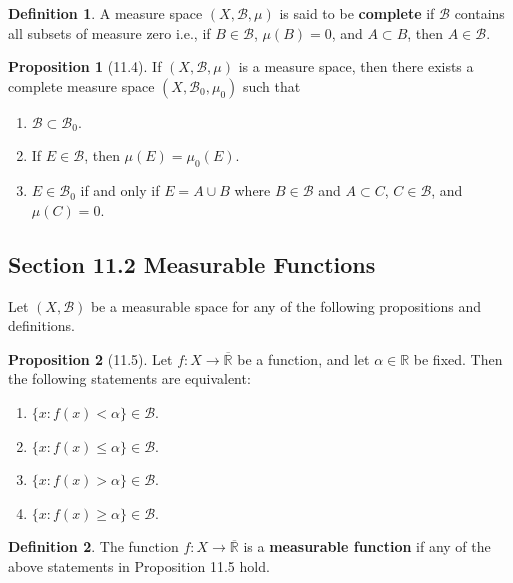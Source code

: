 \documentclass[12pt]{article}
\newcommand{\R}{\mathbb{R}}
\newcommand{\B}{\mathcal{B}}
\theoremstyle{definition}
\newtheorem*{definition}{Definition}
\newtheorem*{prop}{Proposition}
\begin{document}
\begin{definition}
  A measure space \( (X, \B, \mu) \) is said to be \textbf{complete} if \( \B \) contains all subsets of measure zero i.e., if \( B \in \B \), \( \mu(B) = 0 \), and \( A \subset B \), then \( A \in \B \).
\end{definition}

\begin{prop}[11.4]

  If \( (X, \B, \mu) \) is a measure space, then there exists a complete measure space \( (X, \B_0, \mu_0) \) such that 
    \begin{enumerate}[label = (\roman{*})]
      \item \( \B \subset \B_0 \).  
      \item If \( E \in \B \), then \( \mu(E) = \mu_0(E) \). 
      \item \( E \in \B_0 \) if and only if \( E = A \cup B \) where \( B \in \B \) and \( A \subset C \), \( C \in \B \), and \( \mu(C) = 0 \). 
    \end{enumerate}

\end{prop}

\subsection*{Section 11.2 Measurable Functions}

Let \( (X, \B) \) be a measurable space for any of the following propositions and definitions. 

\begin{prop}[11.5]
  
  Let \( f: X \to \overline{\R} \) be a function, and let \( \alpha \in \R \) be fixed.
  Then the following statements are equivalent:
    \begin{enumerate}[label = (\roman{*})]
        \item \(\{x: f(x) < \alpha\} \in \B \). 
        \item \(\{x: f(x) \leq \alpha\} \in \B \).  
        \item \(\{x: f(x) > \alpha\} \in \B \). 
        \item \(\{x: f(x) \geq \alpha\} \in \B \). 
    \end{enumerate}
\end{prop}

\begin{definition}
  The function \( f: X \to \overline{\R} \) is a \textbf{measurable function} if any of the above statements in Proposition 11.5 hold. 
\end{definition}
\end{document}
